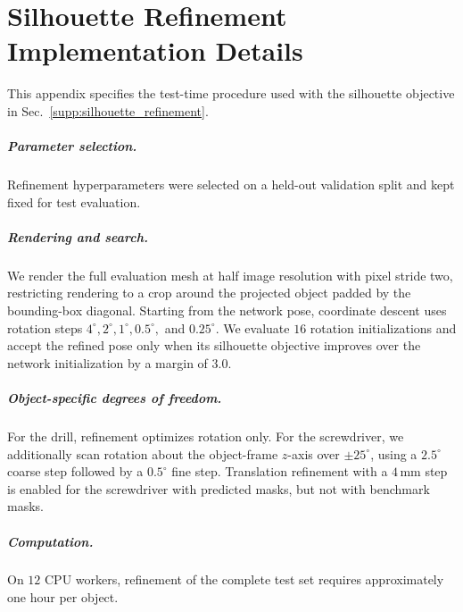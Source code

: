 \chapter{Silhouette Refinement Implementation Details}
\label{app:refinement}
This appendix specifies the test-time procedure used with the silhouette
objective in Sec.~\ref{supp:silhouette_refinement}.

\paragraph{Parameter selection.}
Refinement hyperparameters were selected on a held-out validation split and
kept fixed for test evaluation.

\paragraph{Rendering and search.}
We render the full evaluation mesh at half image resolution with pixel stride
two, restricting rendering to a crop around the projected object padded by
the bounding-box diagonal.
Starting from the network pose, coordinate descent uses rotation steps
\(4^\circ,2^\circ,1^\circ,0.5^\circ,\) and \(0.25^\circ\).
We evaluate \(16\) rotation initializations and accept the refined pose only
when its silhouette objective improves over the network initialization by a
margin of \(3.0\).

\paragraph{Object-specific degrees of freedom.}
For the drill, refinement optimizes rotation only.
For the screwdriver, we additionally scan rotation about the object-frame
\(z\)-axis over \(\pm25^\circ\), using a \(2.5^\circ\) coarse step followed
by a \(0.5^\circ\) fine step.
Translation refinement with a \(4\,\mathrm{mm}\) step is enabled for the
screwdriver with predicted masks, but not with benchmark masks.

\paragraph{Computation.}
On \(12\) CPU workers, refinement of the complete test set requires
approximately one hour per object.
